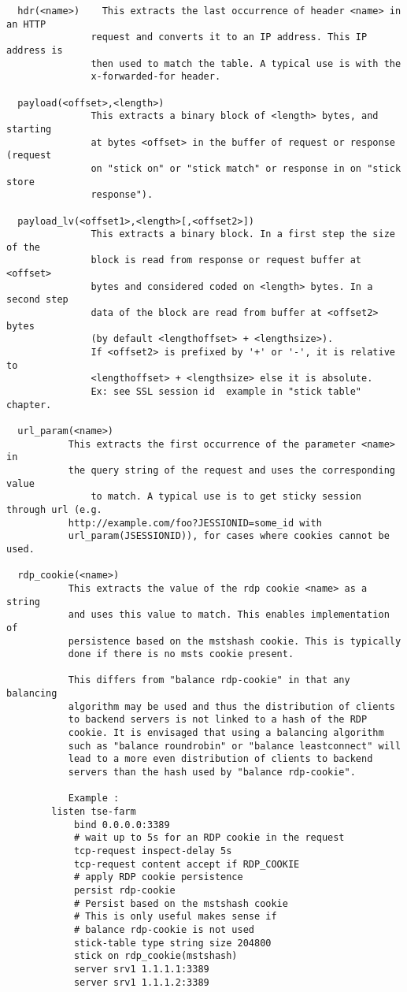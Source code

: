 \begin{verbatim}
  hdr(<name>)    This extracts the last occurrence of header <name> in an HTTP
               request and converts it to an IP address. This IP address is
               then used to match the table. A typical use is with the
               x-forwarded-for header.

  payload(<offset>,<length>)
               This extracts a binary block of <length> bytes, and starting
               at bytes <offset> in the buffer of request or response (request
               on "stick on" or "stick match" or response in on "stick store
               response").

  payload_lv(<offset1>,<length>[,<offset2>])
               This extracts a binary block. In a first step the size of the
               block is read from response or request buffer at <offset>
               bytes and considered coded on <length> bytes. In a second step
               data of the block are read from buffer at <offset2> bytes
               (by default <lengthoffset> + <lengthsize>).
               If <offset2> is prefixed by '+' or '-', it is relative to
               <lengthoffset> + <lengthsize> else it is absolute.
               Ex: see SSL session id  example in "stick table" chapter.
                
  url_param(<name>)
	       This extracts the first occurrence of the parameter <name> in
	       the query string of the request and uses the corresponding value
               to match. A typical use is to get sticky session through url (e.g.
	       http://example.com/foo?JESSIONID=some_id with
	       url_param(JSESSIONID)), for cases where cookies cannot be used.

  rdp_cookie(<name>)
	       This extracts the value of the rdp cookie <name> as a string
	       and uses this value to match. This enables implementation of
	       persistence based on the mstshash cookie. This is typically
	       done if there is no msts cookie present.

	       This differs from "balance rdp-cookie" in that any balancing
	       algorithm may be used and thus the distribution of clients
	       to backend servers is not linked to a hash of the RDP
	       cookie. It is envisaged that using a balancing algorithm
	       such as "balance roundrobin" or "balance leastconnect" will
	       lead to a more even distribution of clients to backend
	       servers than the hash used by "balance rdp-cookie".

	       Example :
		listen tse-farm
		    bind 0.0.0.0:3389
		    # wait up to 5s for an RDP cookie in the request
		    tcp-request inspect-delay 5s
		    tcp-request content accept if RDP_COOKIE
		    # apply RDP cookie persistence
		    persist rdp-cookie
		    # Persist based on the mstshash cookie
		    # This is only useful makes sense if
		    # balance rdp-cookie is not used
		    stick-table type string size 204800
		    stick on rdp_cookie(mstshash)
		    server srv1 1.1.1.1:3389
		    server srv1 1.1.1.2:3389


\end{verbatim}
